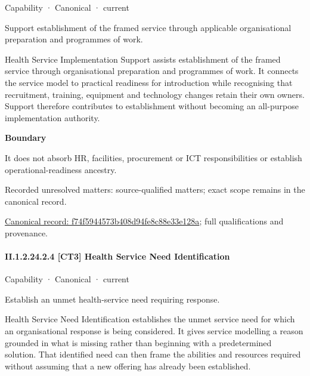 \label{element:f74f5944573b408d94fe8c88e33e128a}
{\small Capability · Canonical · current}\par

Support establishment of the framed service through applicable organisational preparation and programmes of work.



Health Service Implementation Support assists establishment of the framed service through organisational preparation and programmes of work. It connects the service model to practical readiness for introduction while recognising that recruitment, training, equipment and technology changes retain their own owners. Support therefore contributes to establishment without becoming an all-purpose implementation authority.



\textbf{Boundary}



It does not absorb HR, facilities, procurement or ICT responsibilities or establish operational-readiness ancestry.


{\small Recorded unresolved matters: source-qualified matters; exact scope remains in the canonical record.}\par
{\footnotesize \href{../../../../continuum/strategy/capability/f74f5944573b408d94fe8c88e33e128a.md}{Canonical record: f74f5944573b408d94fe8c88e33e128a}; full qualifications and provenance.}\par
\paragraph*{II.1.2.24.2.4 [CT3] Health Service Need Identification}
\label{navigation:II.1.2.24.2.4}

\label{element:976c90e05d0e44b1b24c89bf61eac005}
{\small Capability · Canonical · current}\par

Establish an unmet health-service need requiring response.



Health Service Need Identification establishes the unmet service need for which an organisational response is being considered. It gives service modelling a reason grounded in what is missing rather than beginning with a predetermined solution. That identified need can then frame the abilities and resources required without assuming that a new offering has already been established.



